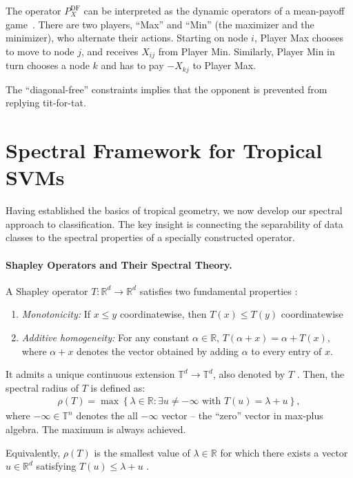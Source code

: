 \documentclass{article}
\renewcommand{\leq}{\leqslant}
\newcommand{\R}{\mathbb{R}}
\newcommand{\T}{\mathbb{T}}
\begin{document}
The operator $P_X^{\text{DF}}$ can be interpreted as the dynamic operators of a mean-payoff game~\cite{AGGut10}.
There are two players, ``Max'' and ``Min'' (the maximizer
and the minimizer), who alternate their actions. Starting on node
$i$, Player Max chooses to move to node $j$, and receives $X_{ij}$
from Player Min. Similarly, Player Min in turn chooses a node $k$
and has to pay $-X_{kj}$ to Player Max.

The ``diagonal-free'' constraints implies that the opponent is prevented from replying tit-for-tat.



\section{Spectral Framework for Tropical SVMs}\label{sec:spectral}

Having established the basics of tropical geometry, we now develop our spectral approach to classification. The key insight is connecting the separability of data classes to the spectral properties of a specially constructed operator.

\paragraph{Shapley Operators and Their Spectral Theory.}
A Shapley operator $T: \R^d \to \R^d$ satisfies two fundamental properties \cite{kolokoltsov1992}:
\begin{enumerate}
    \item \textit{Monotonicity:} If $x \leq y$ coordinatewise, then $T(x) \leq T(y)$ coordinatewise
    \item \textit{Additive homogeneity:} For any constant $\alpha \in \R$, $T(\alpha + x) = \alpha + T(x)$,
      where $\alpha +x$ denotes the vector obtained by adding $\alpha$ to every entry of $x$.
\end{enumerate}
It admits a unique continuous extension $\T^d\to \T^d$, also denoted by $T$ \cite{akian_correspondence_2011}. Then, the spectral radius of $T$ is defined as:
\begin{align}
\rho(T) = \max\left\{\lambda \in \R : \exists u \neq -\infty \text{ with } T(u) = \lambda + u\right\},
\end{align}
where $-\infty\in \T^n$ denotes the all $-\infty$ vector -- the ``zero'' vector in max-plus algebra.
The maximum is always achieved.

Equivalently, $\rho(T)$ is the smallest value of $\lambda\in \R$ for which there exists a vector $u\in\R^d$
satisfying $T(u) \leq \lambda + u$ \cite{nussbaum1986,AGGut10,akiangaubertqisaadi}.
\end{document}
